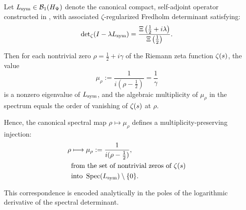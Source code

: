 \begin{lemma}
\label{lem:zero_to_eigenvalue_injection}
Let \( L_{\mathrm{sym}} \in \mathcal{B}_1(H_{\Psi}) \) denote the canonical compact, self-adjoint operator constructed in , with associated \(\zeta\)-regularized Fredholm determinant satisfying:
\[
\det\nolimits_\zeta(I - \lambda L_{\mathrm{sym}}) = \frac{\Xi\left(\tfrac{1}{2} + i\lambda\right)}{\Xi\left(\tfrac{1}{2}\right)}.
\]

Then for each nontrivial zero \( \rho = \tfrac{1}{2} + i\gamma \) of the Riemann zeta function \( \zeta(s) \), the value
\[
\mu_\rho := \frac{1}{i(\rho - \tfrac{1}{2})} = \frac{1}{\gamma}
\]
is a nonzero eigenvalue of \( L_{\mathrm{sym}} \), and the algebraic multiplicity of \( \mu_\rho \) in the spectrum equals the order of vanishing of \( \zeta(s) \) at \( \rho \).

\medskip
\noindent
Hence, the canonical spectral map \( \rho \mapsto \mu_\rho \) defines a multiplicity-preserving injection:
\[
\begin{aligned}
\rho &\longmapsto \mu_\rho := \frac{1}{i(\rho - \tfrac{1}{2})}, \\
&\text{from the set of nontrivial zeros of } \zeta(s) \\
&\text{into } \operatorname{Spec}(L_{\mathrm{sym}}) \setminus \{0\}.
\end{aligned}
\]

\noindent
This correspondence is encoded analytically in the poles of the logarithmic derivative of the spectral determinant.
\end{lemma}
